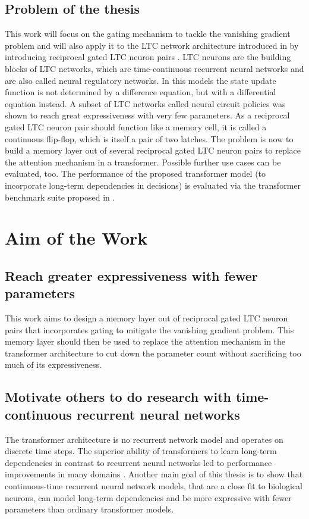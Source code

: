 \documentclass{article}
\begin{document}
\subsection{Problem of the thesis}
This work will focus on the gating mechanism to tackle the vanishing gradient problem and will also apply it to the LTC network architecture introduced in \cite{LTCNetworks} by introducing reciprocal gated LTC neuron pairs \cite{RCNN_ReciprocalGatedCell}.
LTC neurons are the building blocks of LTC networks, which are time-continuous recurrent neural networks and are also called neural regulatory networks. 
In this models the state update function is not determined by a difference equation, but with a differential equation instead.
A subset of LTC networks called neural circuit policies \cite{NCP} was shown to reach great expressiveness with very few parameters.
As a reciprocal gated LTC neuron pair should function like a memory cell, it is called a continuous flip-flop, which is itself a pair of two latches.
The problem is now to build a memory layer out of several reciprocal gated LTC neuron pairs to replace the attention mechanism in a transformer.
Possible further use cases can be evaluated, too.
The performance of the proposed transformer model (to incorporate long-term dependencies in decisions) is evaluated via the transformer benchmark suite proposed in \cite{TransformerBenchmark}.
\section{Aim of the Work}
\subsection{Reach greater expressiveness with fewer parameters}
This work aims to design a memory layer out of reciprocal gated LTC neuron pairs that incorporates gating to mitigate the vanishing gradient problem.
This memory layer should then be used to replace the attention mechanism in the transformer architecture to cut down the parameter count without sacrificing too much of its expressiveness. 
\subsection{Motivate others to do research with time-continuous recurrent neural networks}
The transformer architecture is no recurrent network model and operates on discrete time steps. 
The superior ability of transformers to learn long-term dependencies in contrast to recurrent neural networks led to performance improvements in many domains \cite{Transformer,TransformerforRL}.
Another main goal of this thesis is to show that continuous-time recurrent neural network models, that are a close fit to biological neurons, can model long-term dependencies and be more expressive with fewer parameters than ordinary transformer models.
\end{document}
